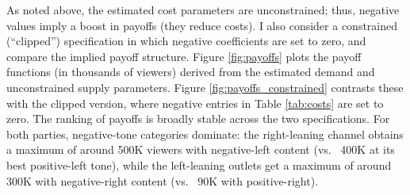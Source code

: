 \documentclass[12pt]{article}
\begin{document}




As noted above, the estimated cost parameters are unconstrained; thus, negative values imply a boost in payoffs (they reduce costs). I also consider a constrained (“clipped”) specification in which negative coefficients are set to zero, and compare the implied payoff structure. Figure \ref{fig:payoffs} plots the payoff functions (in thousands of viewers) derived from the estimated demand and unconstrained supply parameters. Figure \ref{fig:payoffs_constrained} contrasts these with the clipped version, where negative entries in Table \ref{tab:costs} are set to zero. The ranking of payoffs is broadly stable across the two specifications. For both parties, negative-tone categories dominate: the right-leaning channel obtains a maximum of  around 500K viewers with negative-left content (vs. ~400K at its best positive-left tone), while the left-leaning outlets get a maximum of around 300K with negative-right content (vs. ~90K with positive-right).







\end{document}
